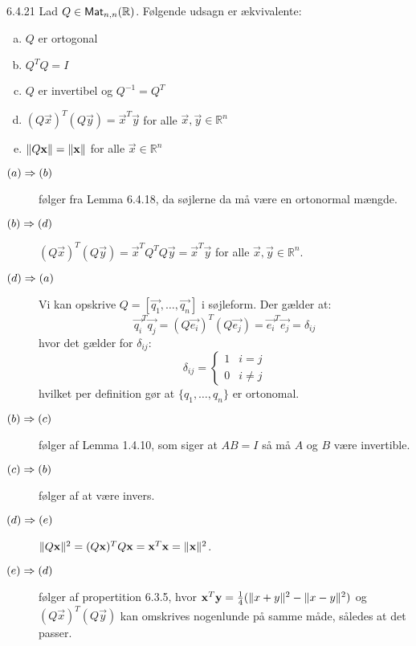 \begin{saetning}{6.4.21}
	Lad $Q \in \textsf{Mat}_{n,n}(\mathbb{R})$. Følgende udsagn er ækvivalente:
	\begin{enumerate}[(a)]
		\item $Q$ er ortogonal
		\item $Q^TQ = I$
		\item $Q$ er invertibel og $Q^{-1} = Q^T$
		\item $(Q\vec{x})^T(Q\vec{y}) = \vec{x}^T\vec{y}$ for alle $\vec{x}, 
			\vec{y} \in \mathbb{R}^n$
		\item $\lVert Q\mathbf{x}\rVert = \lVert\mathbf{x}\rVert$ for alle $\vec{x} \in 
			\mathbb{R}^n$
	\end{enumerate}
\end{saetning}

\begin{bevis}
	\begin{description}
		\item[$(a)\Rightarrow(b)$] følger fra Lemma 6.4.18, da søjlerne da må være en 
			ortonormal mængde.
		\item[$(b)\Rightarrow(d)$] $(Q\vec{x})^T(Q\vec{y}) = \vec{x}^TQ^TQ\vec{y} = 
			\vec{x}^T\vec{y}$ for alle $\vec{x}, \vec{y} \in \mathbb{R}^n$.
		\item[$(d)\Rightarrow(a)$] Vi kan opskrive $Q = [\vec{q_1}, \dotsc, \vec{q_n}]$
			i søjleform. Der gælder at:
			\[
				\vec{q_i}^T\vec{q_j} = (Q\vec{e_i})^T(Q\vec{e_j}) = 
				\vec{e_i}^T\vec{e_j} = \delta_{ij}
			\]
			hvor det gælder for $\delta_{ij}$:
			\[
				\delta_{ij} = \begin{cases}1 & i = j\\0 & i \not= j\end{cases}
			\]
			hvilket per definition gør at $\{q_1, \dotsc, q_n\}$ er ortonomal.
		\item[$(b)\Rightarrow(c)$] følger af Lemma 1.4.10, som siger at $AB = I$ så må
			$A$ og $B$ være invertible.
		\item[$(c)\Rightarrow(b)$] følger af at være invers.
		\item[$(d)\Rightarrow(e)$] $\lVert Q\mathbf{x}\rVert^2 = (Q\mathbf{x})^TQ\mathbf{x} = 
			\mathbf{x}^T\mathbf{x} = \lVert\mathbf{x}\rVert^2$.
		\item[$(e)\Rightarrow(d)$] følger af propertition 6.3.5, hvor 
			$\mathbf{x}^T\mathbf{y} = \frac{1}{4}(\lVert x + y\rVert^2-\lVert x-y\rVert^2)$ og 
			$(Q\vec{x})^T(Q\vec{y})$ kan omskrives nogenlunde på samme måde, 
			således at det passer.
	\end{description}
\end{bevis}
